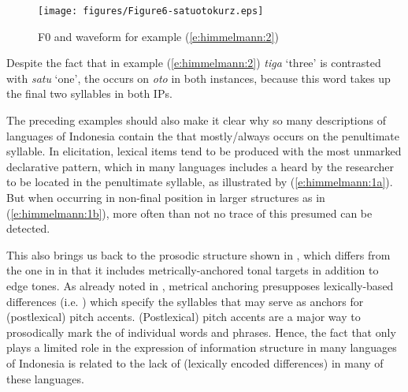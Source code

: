 \documentclass[output=paper
,modfonts
,nonflat]{langsci/langscibook}
\begin{document}

 
\begin{figure}
	\texttt{[image: figures/Figure6-satuotokurz.eps]}
	\caption{F0 and waveform for example (\ref{e:himmelmann:2}) \protect \footnotemark}
	\label{f6}
\end{figure}

\noindent
Despite the fact that in example (\ref{e:himmelmann:2}) \textit{tiga} ‘three’ is contrasted with \textit{satu} ‘one’, the  occurs on \textit{oto} in both instances, because this word takes up the final two syllables in both IPs.

The preceding examples should also make it clear why so many descriptions of  languages of Indonesia contain the  that  mostly/always occurs on the penultimate syllable. In elicitation, lexical items tend to be produced with the most unmarked declarative  pattern, which in many languages includes a  heard by the researcher to be located in the penultimate syllable, as illustrated by (\ref{e:himmelmann:1a}). But when occurring in non-final position in larger structures as in (\ref{e:himmelmann:1b}), more often than not no trace of this presumed  can be detected. 

This also brings us back to the prosodic structure shown in , which differs from the one in  in that it includes metrically-anchored tonal targets in addition to edge tones. As already noted in , metrical anchoring presupposes lexically-based  differences (i.e. ) which specify the syllables that may serve as anchors for (postlexical) pitch accents. (Postlexical) pitch accents are a major way to prosodically mark the  of individual words and phrases. Hence, the fact that  only plays a limited role in the expression of information structure in many  languages of Indonesia is related to the lack of  (lexically encoded  differences) in many of these languages.
\end{document}
